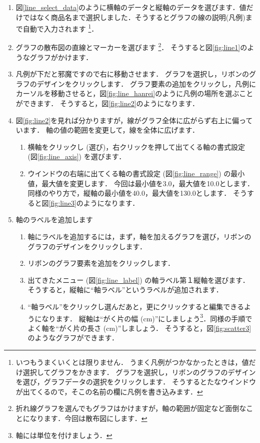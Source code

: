 \begin{enumerate}
    \item 図\ref{line_select_data}のように横軸のデータと縦軸のデータを選びます．値だけではなく商品名まで選択しました．そうするとグラフの線の説明(凡例)まで自動で入力されます
    \footnote{いつもうまくいくとは限りません．
      うまく凡例がつかなかったときは，値だけ選択してグラフをかきます．
      グラフを選択し，リボンのグラフのデザインを選び，グラフデータの選択をクリックします．
      そうするとたなウインドウが出てくるので，そこの名前の欄に凡例を書き込みます．}．
    \item グラフの散布図の直線とマーカーを選びます
    \footnote{折れ線グラフを選んでもグラフはかけますが，軸の範囲が固定など面倒なことになります．今回は散布図にします．}．
    そうすると図\ref{fig:line1}のようなグラフがかけます．
    \item 凡例が下だと邪魔ですので右に移動させます．
    グラフを選択し，リボンのグラフのデザインをクリックします．
    グラフ要素の追加をクリックし，凡例にカーソルを移動させると，図\ref{fig:line_hanrei}のように凡例の場所を選ぶことができます．
    そうすると，図\ref{fig:line2}のようになります．
    \item 図\ref{fig:line2}を見れば分かりますが，線がグラフ全体に広がらず右上に偏っています．
    軸の値の範囲を変更して，線を全体に広げます．
    \begin{enumerate}
        \item 横軸をクリックし (選び)，右クリックを押して出てくる軸の書式設定 (図\ref{fig:line_axis}) を選びます．
        \item ウインドウの右端に出てくる軸の書式設定 (図\ref{fig:line_range}) の最小値，最大値を変更します．
        今回は最小値を3.0，最大値を10.0とします．
        同様のやり方で，縦軸の最小値を40.0，最大値を130.0とします．
        そうすると図\ref{fig:line3}のようになります．
    \end{enumerate}
    \item 軸のラベルを追加します
    \begin{enumerate}
        \item 軸にラベルを追加するには，まず，軸を加えるグラフを選び，リボンのグラフのデザインをクリックします．
        \item リボンのグラフ要素を追加をクリックします．
        \item 出てきたメニュー (図\ref{fig:line_label}) の軸ラベル第１縦軸を選びます．
        そうすると，縦軸に``軸ラベル''というラベルが追加されます．
        \item ``軸ラベル''をクリックし選んだあと，更にクリックすると編集できるようになります．
        縦軸は``がく片の幅 (cm)''にしましょう\footnote{軸には単位を付けましょう．}．同様の手順でよく軸を``がく片の長さ (cm)''しましょう．
        そうすると，図\ref{fig:scatter3}のようなグラフができます．
    \end{enumerate}

\end{enumerate}


